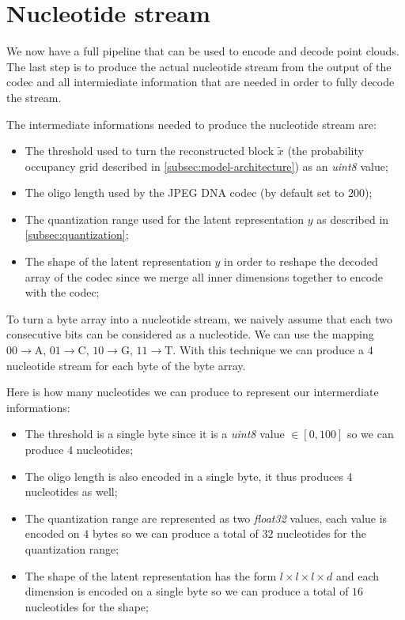 \section{Nucleotide stream}

We now have a full pipeline that can be used to encode and decode point clouds. The last step is to produce the actual nucleotide stream from the output of the codec and all intermiediate information that are needed in order to fully decode the stream.

The intermediate informations needed to produce the nucleotide stream are:
\begin{itemize}
    \item The threshold used to turn the reconstructed block $\tilde{x}$ (the probability occupancy grid described in \ref{subsec:model-architecture}) as an \textit{uint8} value;
    \item The oligo length used by the JPEG DNA codec (by default set to 200);
    \item The quantization range used for the latent representation $y$ as described in \ref{subsec:quantization};
    \item The shape of the latent representation $y$ in order to reshape the decoded array of the codec since we merge all inner dimensions together to encode with the codec;
\end{itemize}

To turn a byte array into a nucleotide stream, we naively assume that each two consecutive bits can be considered as a nucleotide. We can use the mapping  
$00 \rightarrow \text{A}$,
$01 \rightarrow \text{C}$,
$10 \rightarrow \text{G}$,
$11 \rightarrow \text{T}$.
With this technique we can produce a $4$ nucleotide stream for each byte of the byte array.

Here is how many nucleotides we can produce to represent our intermerdiate informations:
\begin{itemize}
    \item The threshold is a single byte since it is a \textit{uint8} value $\in [0, 100]$ so we can produce $4$ nucleotides;
    \item The oligo length is also encoded in a single byte, it thus produces $4$ nucleotides as well;
    \item The quantization range are represented as two \textit{float32} values, each value is encoded on $4$ bytes so we can produce a total of $32$ nucleotides for the quantization range;
    \item The shape of the latent representation has the form $l \times l \times l \times d$ and each dimension is encoded on a single byte so we can produce a total of $16$ nucleotides for the shape;
\end{itemize}

